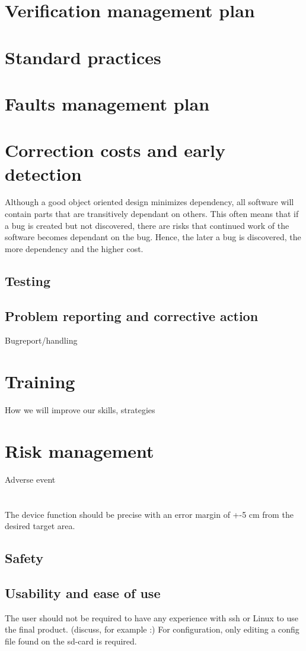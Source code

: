 \documentclass{article}
\begin{document}
\section{Verification management plan}
\section{Standard practices}
\section{Faults management plan}
\section{Correction costs and early detection}
Although a good object oriented design minimizes dependency, all software will contain parts that are transitively dependant on others. This often means that if a bug is created but not discovered, there are risks that continued work of the software becomes dependant on the bug. Hence, the later a bug is discovered, the more dependency and the higher cost.

\subsection{Testing}
\subsection{Problem reporting and corrective action}
Bugreport/handling
\section{Training}
How we will improve our skills, strategies
\section{Risk management}
Adverse event
\section{}

The device function should be precise with an error margin of +-5 cm from the desired target area. 

\subsection{Safety}

\subsection{Usability and ease of use}
The user should not be required to have any experience with ssh or Linux to use the final product. (discuss, for example :) For configuration, only editing a config file found on the sd-card is required.
\end{document}
